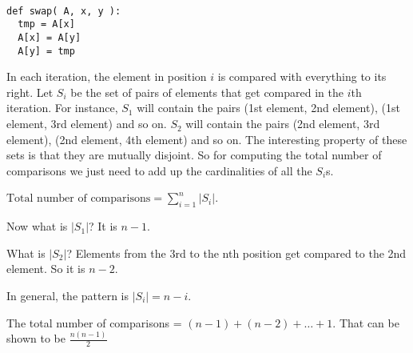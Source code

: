 \documentclass[12pt]{article}
\begin{document}
\begin{enumerate}
\begin{verbatim}
 
def swap( A, x, y ):
  tmp = A[x]
  A[x] = A[y]
  A[y] = tmp

\end{verbatim}

In each iteration, the element in position $i$ is compared with everything to its right. 
Let $S_i$ be the set of pairs of elements that get compared in the $i$th iteration. For instance, $S_1$ will contain the pairs (1st element, 2nd element), (1st element, 3rd element) and so on. 
$S_2$ will contain the pairs (2nd element, 3rd element), (2nd element, 4th element) and so on.
The interesting property of these sets is that they are mutually disjoint. So for computing the total number of comparisons we just need to add up the cardinalities of all the $S_i$s.

$\displaystyle \text{Total number of comparisons} = \sum_{i=1}^n |S_i|$.

Now what is $|S_1|$? It is $n-1$.

What is $|S_2|$? Elements from the 3rd to the nth position get compared to the 2nd element. So it is $n-2$.

In general, the pattern is $|S_i| = n-i$. 

The total number of comparisons = $(n - 1 )+ (n-2) + \ldots + 1$. That can be shown to be $\frac{n(n-1)}{2}$

\end{enumerate}
\end{document}
